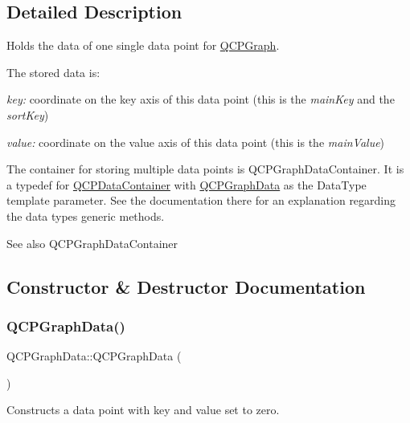 \subsection{Detailed Description}
Holds the data of one single data point for \hyperlink{classQCPGraph}{Q\+C\+P\+Graph}. 

The stored data is\+: \begin{DoxyItemize}
\item {\itshape key\+:} coordinate on the key axis of this data point (this is the {\itshape main\+Key} and the {\itshape sort\+Key}) \item {\itshape value\+:} coordinate on the value axis of this data point (this is the {\itshape main\+Value})\end{DoxyItemize}
The container for storing multiple data points is Q\+C\+P\+Graph\+Data\+Container. It is a typedef for \hyperlink{classQCPDataContainer}{Q\+C\+P\+Data\+Container} with \hyperlink{classQCPGraphData}{Q\+C\+P\+Graph\+Data} as the Data\+Type template parameter. See the documentation there for an explanation regarding the data type\textquotesingle{}s generic methods.

\begin{DoxySeeAlso}{See also}
Q\+C\+P\+Graph\+Data\+Container 
\end{DoxySeeAlso}


\subsection{Constructor \& Destructor Documentation}
\mbox{\label{classQCPGraphData_ac43f7499383d2fa2ffb7a4ad43f76c7c}} 
\subsubsection{\texorpdfstring{Q\+C\+P\+Graph\+Data()}{QCPGraphData()}\hspace{0.1cm}{\footnotesize\ttfamily [1/2]}}
{\footnotesize\ttfamily Q\+C\+P\+Graph\+Data\+::\+Q\+C\+P\+Graph\+Data (\begin{DoxyParamCaption}{ }\end{DoxyParamCaption})}

Constructs a data point with key and value set to zero. \mbox{\label{classQCPGraphData_a2c32177f12f902f4e05f712837082bd6}} 
